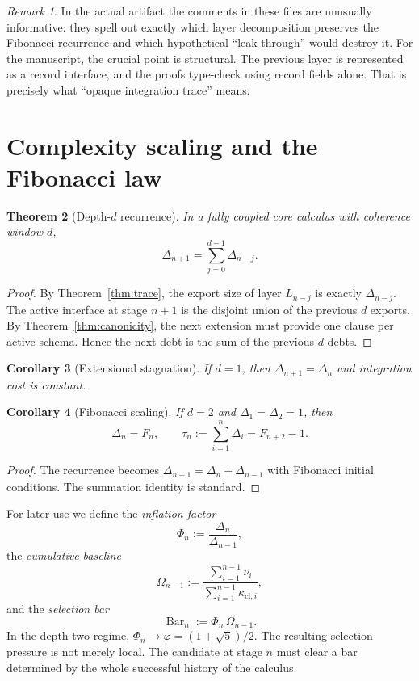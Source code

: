 \documentclass{lmcs}
\theoremstyle{plain}
\newtheorem{thm}{Theorem}[section]
\newtheorem{cor}[thm]{Corollary}
\theoremstyle{definition}
\theoremstyle{remark}
\newtheorem{rem}[thm]{Remark}
\newcommand{\SelBar}{\ensuremath{\operatorname{Bar}}}
\begin{document}
\begin{rem}
In the actual artifact the comments in these files are unusually informative: they spell out exactly which layer decomposition preserves the Fibonacci recurrence and which hypothetical ``leak-through'' would destroy it.
For the manuscript, the crucial point is structural.
The previous layer is represented as a record interface, and the proofs type-check using record fields alone.
That is precisely what ``opaque integration trace'' means.
\end{rem}

\section{Complexity scaling and the Fibonacci law}
\label{sec:scaling}

\begin{thm}[Depth-$d$ recurrence]
\label{thm:recurrence}
In a fully coupled core calculus with coherence window $d$,
\[
  \Delta_{n+1}=\sum_{j=0}^{d-1}\Delta_{n-j}.
\]
\end{thm}

\begin{proof}
By Theorem~\ref{thm:trace}, the export size of layer $L_{n-j}$ is exactly $\Delta_{n-j}$.
The active interface at stage $n+1$ is the disjoint union of the previous $d$ exports.
By Theorem~\ref{thm:canonicity}, the next extension must provide one clause per active schema.
Hence the next debt is the sum of the previous $d$ debts.
\end{proof}

\begin{cor}[Extensional stagnation]
If $d=1$, then $\Delta_{n+1}=\Delta_n$ and integration cost is constant.
\end{cor}

\begin{cor}[Fibonacci scaling]
\label{cor:fibonacci}
If $d=2$ and $\Delta_1=\Delta_2=1$, then
\[
  \Delta_n=F_n,\qquad
  \tau_n:=\sum_{i=1}^n\Delta_i=F_{n+2}-1.
\]
\end{cor}

\begin{proof}
The recurrence becomes $\Delta_{n+1}=\Delta_n+\Delta_{n-1}$ with Fibonacci initial conditions.
The summation identity is standard.
\end{proof}

For later use we define the \emph{inflation factor}
\[
  \Phi_n := \frac{\Delta_n}{\Delta_{n-1}},
\]
the \emph{cumulative baseline}
\[
  \Omega_{n-1} := \frac{\sum_{i=1}^{n-1}\nu_i}{\sum_{i=1}^{n-1}\kappa_{\mathrm{cl},i}},
\]
and the \emph{selection bar}
\[
  \SelBar_n := \Phi_n\,\Omega_{n-1}.
\]
In the depth-two regime, $\Phi_n\to \varphi=(1+\sqrt 5)/2$.
The resulting selection pressure is not merely local.
The candidate at stage $n$ must clear a bar determined by the whole successful history of the calculus.
\end{document}
